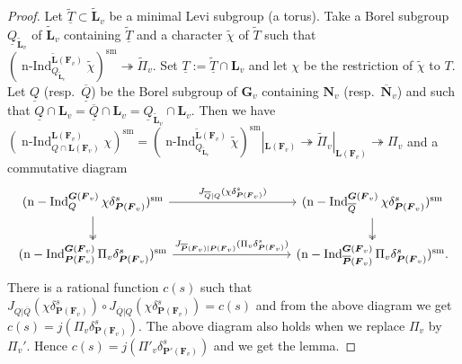 \documentclass[a4paper]{amsart}
\numberwithin{equation}{section}
\theoremstyle{remark}
\theoremstyle{definition}
\DeclareMathOperator{\nInd}{n-Ind}
\newcommand{\sm}{\mathrm{sm}}
\newcommand{\alggrp}[1]{\underline{#1}}
\newcommand{\glob}[1]{\boldsymbol{#1}}
\begin{document}
\begin{proof}
Let $\widetilde{\alggrp{T}}\subset \widetilde{\glob{L}}_{v}$ be a minimal Levi subgroup (a torus). Take a Borel subgroup $\alggrp{Q}_{\widetilde{\glob{L}}_{v}}$ of $\widetilde{\glob{L}}_{v}$ containing $\widetilde{\alggrp{T}}$ and a character $\widetilde{\chi}$ of $\widetilde{T}$ such that $(\nInd_{Q_{\widetilde{\glob{L}}_{v}}}^{\widetilde{\glob{L}}(\glob{F}_{v})}\widetilde{\chi})^{\sm}\twoheadrightarrow \widetilde{\Pi}_{v}$.
Set $\alggrp{T} := \widetilde{\alggrp{T}}\cap \glob{L}_{v}$ and let $\chi$ be the restriction of $\widetilde{\chi}$ to $T$.
Let $\alggrp{Q}$ (resp.\ $\overline{\alggrp{Q}}$) be the Borel subgroup of $\glob{G}_{v}$ containing $\glob{N}_{v}$ (resp.\ $\overline{\glob{N}}_{v}$) and such that $\alggrp{Q}\cap \glob{L}_{v} = \overline{\alggrp{Q}}\cap \glob{L}_{v} = \alggrp{Q}_{\widetilde{\glob{L}}_{v}}\cap \glob{L}_{v}$.
Then we have $(\nInd_{Q\cap \glob{L}(\glob{F}_{v})}^{\glob{L}(\glob{F}_{v})}\chi)^{\sm} = (\nInd_{Q_{\widetilde{\glob{L}}_{v}}}^{\widetilde{\glob{L}}(\glob{F}_{v})}\widetilde{\chi})^{\sm}|_{\glob{L}(\glob{F}_{v})}\twoheadrightarrow \widetilde{\Pi}_{v}|_{\glob{L}(\glob{F}_{v})} \twoheadrightarrow \Pi_v$ and a commutative diagram
\[
\begin{tikzcd}[column sep=3.3cm]
(\nInd_{Q}^{\glob{G}(\glob{F}_{v})}\chi\delta_{\glob{P}(\glob{F}_{v})}^{s})^{\sm}\arrow[r,"J_{\overline{Q}|Q}(\chi\delta_{\glob{P}(\glob{F}_{v})}^{s})"]\arrow[d,twoheadrightarrow] &
(\nInd_{\overline{Q}}^{\glob{G}(\glob{F}_{v})}\chi\delta_{\glob{P}(\glob{F}_{v})}^{s})^{\sm}\arrow[d,twoheadrightarrow]\\
(\nInd_{\glob{P}(\glob{F}_{v})}^{\glob{G}(\glob{F}_{v})}\Pi_{v}\delta_{\glob{P}(\glob{F}_{v})}^{s})^{\sm}\arrow[r,"J_{\overline{\glob{P}}(\glob{F}_{v})|\glob{P}(\glob{F}_{v})}(\Pi_{v}\delta_{\glob{P}(\glob{F}_{v})}^{s})"] &
(\nInd_{\overline{\glob{P}}(\glob{F}_{v})}^{\glob{G}(\glob{F}_{v})}\Pi_{v}\delta_{\glob{P}(\glob{F}_{v})}^{s})^{\sm}.
\end{tikzcd}
\]
There is a rational function $c(s)$ such that $J_{Q|\overline{Q}}(\chi\delta_{\glob{P}(\glob{F}_{v})}^{s})\circ J_{\overline{Q}|Q}(\chi\delta_{\glob{P}(\glob{F}_{v})}^{s}) = c(s)$ and from the above diagram we get $c(s) = j(\Pi_{v}\delta_{\glob{P}(\glob{F}_{v})}^{s})$.
The above diagram also holds when we replace $\Pi_{v}$ by $\Pi_{v}'$.
Hence $c(s) = j(\Pi'_{v}\delta_{\glob{P}'(\glob{F}_{v})}^{s})$ and we get the lemma.
\end{proof}
\end{document}
